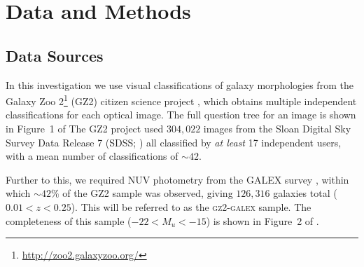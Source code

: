 \documentclass[useAMS,usenatbib]{mn2e}
\begin{document}
 
\section{Data and Methods}\label{sec:data}

\subsection{Data Sources}\label{sec:photo}

\begin{figure}
\label{fig:sfrmass}
\end{figure}

In this investigation we use visual classifications of galaxy morphologies from the Galaxy Zoo 2\footnote{\url{http://zoo2.galaxyzoo.org/}} (GZ2) citizen science project \citep{GZ2}, which obtains multiple independent classifications for each optical image. The full question tree for an image is shown in Figure~1 of \citeauthor{GZ2}  The GZ2 project used $304, 022$ images from the Sloan Digital Sky Survey Data Release 7 (SDSS; \citealt{york00, abazajian09}) all classified by \emph{at least} 17 independent users, with a mean number of classifications of $\sim42$.

Further to this, we required NUV photometry from the GALEX survey \citep{martin05}, within which $\sim42\%$ of the GZ2 sample was observed, giving $126, 316$ galaxies total ($0.01 < z < 0.25$). This will be referred to as the \textsc{gz2-galex} sample. The completeness of this sample ($-22 < M_u < -15$) is shown in Figure~2 of \cite{smethurst15}. 
\end{document}
